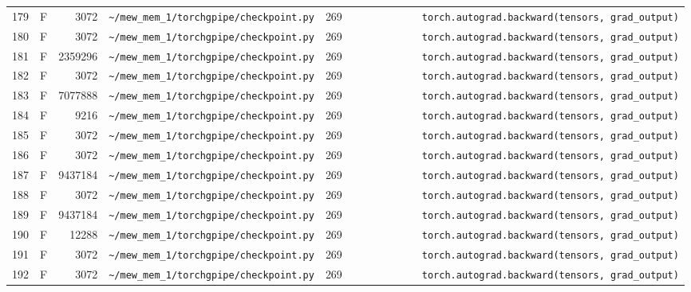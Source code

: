 \documentclass{article}
\begin{document}
\begin{longtable}{r l r p{6.5cm} r p{7.0cm}}
179 & F & 3072 & \lstinline|~/mew_mem_1/torchgpipe/checkpoint.py| & 269 & \lstinline|            torch.autograd.backward(tensors, grad_output)| \\
180 & F & 3072 & \lstinline|~/mew_mem_1/torchgpipe/checkpoint.py| & 269 & \lstinline|            torch.autograd.backward(tensors, grad_output)| \\
181 & F & 2359296 & \lstinline|~/mew_mem_1/torchgpipe/checkpoint.py| & 269 & \lstinline|            torch.autograd.backward(tensors, grad_output)| \\
182 & F & 3072 & \lstinline|~/mew_mem_1/torchgpipe/checkpoint.py| & 269 & \lstinline|            torch.autograd.backward(tensors, grad_output)| \\
183 & F & 7077888 & \lstinline|~/mew_mem_1/torchgpipe/checkpoint.py| & 269 & \lstinline|            torch.autograd.backward(tensors, grad_output)| \\
184 & F & 9216 & \lstinline|~/mew_mem_1/torchgpipe/checkpoint.py| & 269 & \lstinline|            torch.autograd.backward(tensors, grad_output)| \\
185 & F & 3072 & \lstinline|~/mew_mem_1/torchgpipe/checkpoint.py| & 269 & \lstinline|            torch.autograd.backward(tensors, grad_output)| \\
186 & F & 3072 & \lstinline|~/mew_mem_1/torchgpipe/checkpoint.py| & 269 & \lstinline|            torch.autograd.backward(tensors, grad_output)| \\
187 & F & 9437184 & \lstinline|~/mew_mem_1/torchgpipe/checkpoint.py| & 269 & \lstinline|            torch.autograd.backward(tensors, grad_output)| \\
188 & F & 3072 & \lstinline|~/mew_mem_1/torchgpipe/checkpoint.py| & 269 & \lstinline|            torch.autograd.backward(tensors, grad_output)| \\
189 & F & 9437184 & \lstinline|~/mew_mem_1/torchgpipe/checkpoint.py| & 269 & \lstinline|            torch.autograd.backward(tensors, grad_output)| \\
190 & F & 12288 & \lstinline|~/mew_mem_1/torchgpipe/checkpoint.py| & 269 & \lstinline|            torch.autograd.backward(tensors, grad_output)| \\
191 & F & 3072 & \lstinline|~/mew_mem_1/torchgpipe/checkpoint.py| & 269 & \lstinline|            torch.autograd.backward(tensors, grad_output)| \\
192 & F & 3072 & \lstinline|~/mew_mem_1/torchgpipe/checkpoint.py| & 269 & \lstinline|            torch.autograd.backward(tensors, grad_output)| \\

\end{longtable}
\end{document}
